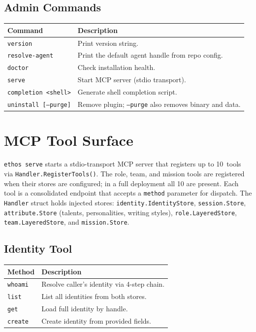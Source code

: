 \documentclass[a4paper,10pt]{article}
\newcommand{\field}[1]{\texttt{#1}}
\newcommand{\cmd}[1]{\texttt{#1}}
\begin{document}
\subsection{Admin Commands}

\begin{center}
\begin{tabular}{@{}lp{6.5cm}@{}}
\toprule
\textbf{Command} & \textbf{Description} \\
\midrule
\cmd{version}              & Print version string. \\
\cmd{resolve-agent}        & Print the default agent handle from repo
                             config. \\
\cmd{doctor}               & Check installation health. \\
\cmd{serve}                & Start MCP server (stdio transport). \\
\cmd{completion <shell>}   & Generate shell completion script. \\
\cmd{uninstall [--purge]}  & Remove plugin; \cmd{--purge} also
                             removes binary and data. \\
\bottomrule
\end{tabular}
\end{center}

\section{MCP Tool Surface}

\texttt{ethos serve} starts a stdio-transport MCP server that
registers up to 10~tools via \texttt{Handler.RegisterTools()}.
The role, team, and mission tools are registered when their stores
are configured; in a full deployment all 10 are present.  Each tool
is a consolidated endpoint that accepts a \field{method} parameter
for dispatch.  The \texttt{Handler} struct holds injected stores:
\texttt{identity.IdentityStore}, \texttt{session.Store},
\texttt{attribute.Store} (talents, personalities, writing styles),
\texttt{role.LayeredStore}, \texttt{team.LayeredStore}, and
\texttt{mission.Store}.

\subsection{Identity Tool}

\begin{center}
\begin{tabular}{@{}lp{6cm}@{}}
\toprule
\textbf{Method} & \textbf{Description} \\
\midrule
\texttt{whoami}  & Resolve caller's identity via 4-step chain. \\
\texttt{list}    & List all identities from both stores. \\
\texttt{get}     & Load full identity by handle. \\
\texttt{create}  & Create identity from provided fields. \\
\bottomrule
\end{tabular}
\end{center}
\end{document}
